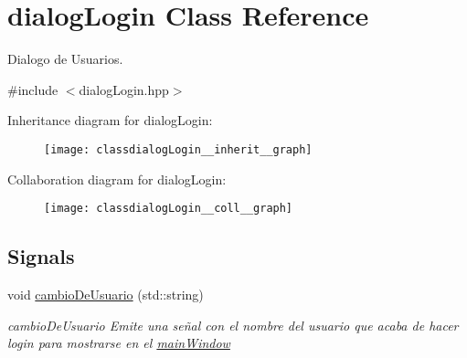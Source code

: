 \hypertarget{classdialogLogin}{}\section{dialog\+Login Class Reference}
\label{classdialogLogin}


Dialogo de Usuarios.  




{\ttfamily \#include $<$dialog\+Login.\+hpp$>$}



Inheritance diagram for dialog\+Login\+:
\nopagebreak
\begin{figure}[H]
\begin{center}
\leavevmode
\texttt{[image: classdialogLogin\_\_inherit\_\_graph]}
\end{center}
\end{figure}


Collaboration diagram for dialog\+Login\+:
\nopagebreak
\begin{figure}[H]
\begin{center}
\leavevmode
\texttt{[image: classdialogLogin\_\_coll\_\_graph]}
\end{center}
\end{figure}
\subsection*{Signals}
\begin{DoxyCompactItemize}
\item 
\hypertarget{classdialogLogin_a051d47d5652799fb46105756e30d60a4}{}void \hyperlink{classdialogLogin_a051d47d5652799fb46105756e30d60a4}{cambio\+De\+Usuario} (std\+::string)\label{classdialogLogin_a051d47d5652799fb46105756e30d60a4}

\begin{DoxyCompactList}\small\item\em cambio\+De\+Usuario Emite una señal con el nombre del usuario que acaba de hacer login para mostrarse en el \hyperlink{classmainWindow}{main\+Window} \end{DoxyCompactList}\end{DoxyCompactItemize}
